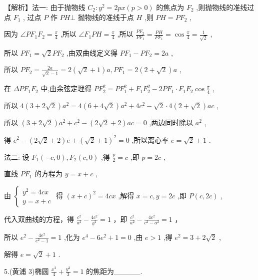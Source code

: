 \documentclass[10pt]{article}
\begin{document}
【解析】法一: 由于抛物线 \({C}_{2} : {y}^{2} = {2px}\left( {p > 0}\right)\) 的焦点为 \({F}_{2}\) ,则抛物线的准线过点 \({F}_{1}\) , 过点 \(P\) 作 \({PH} \bot\) 抛物线的准线于点 \(H\) ,则 \({PH} = P{F}_{2}\) ,

因为 \(\angle P{F}_{1}{F}_{2} = \frac{\pi }{4}\) ,所以 \(\angle {F}_{1}{PH} = \frac{\pi }{4}\) ,所以 \(\frac{P{F}_{2}}{P{F}_{1}} = \frac{PH}{P{F}_{1}} = \cos \frac{\pi }{4} = \frac{1}{\sqrt{2}}\) ,

所以 \(P{F}_{1} = \sqrt{2}P{F}_{2}\) ,由双曲线定义得 \(P{F}_{1} - P{F}_{2} = {2a}\) ,

所以 \(P{F}_{2} = \frac{2a}{\sqrt{2} - 1} = 2\left( {\sqrt{2} + 1}\right) a,P{F}_{1} = 2\left( {2 + \sqrt{2}}\right) a\) ,

在 \({\Delta P}{F}_{1}{F}_{2}\) 中,由余弦定理得 \(P{F}_{2}^{2} = P{F}_{1}^{2} + {F}_{1}{F}_{2}^{2} - {2P}{F}_{1} \cdot  {F}_{1}{F}_{2}\cos \frac{\pi }{4}\) ,

所以 \(4\left( {3 + 2\sqrt{2}}\right) {a}^{2} = 4\left( {6 + 4\sqrt{2}}\right) {a}^{2} + 4{c}^{2} - \sqrt{2} \cdot  4\left( {2 + \sqrt{2}}\right) {ac}\) ,

所以 \(\left( {3 + 2\sqrt{2}}\right) {a}^{2} + {c}^{2} - \left( {2\sqrt{2} + 2}\right) {ac} = 0\) ,两边同时除以 \({a}^{2}\) ,

得 \({e}^{2} - \left( {2\sqrt{2} + 2}\right) e + {\left( \sqrt{2} + 1\right) }^{2} = 0\) ,所以离心率 \(e = \sqrt{2} + 1\) .

法二: 设 \({F}_{1}\left( {-c,0}\right) ,{F}_{2}\left( {c,0}\right)\) ,得 \(\frac{p}{2} = c\) ,即 \(p = {2c}\) ,

直线 \(P{F}_{1}\) 的方程为 \(y = x + c\) ,

由 \(\left\{  \begin{array}{l} {y}^{2} = {4cx} \\  y = x + c \end{array}\right.\) 得 \({\left( x + c\right) }^{2} = {4cx}\) ,解得 \(x = c,y = {2c}\) ,即 \(P\left( {c,{2c}}\right)\) ,

代入双曲线的方程，得 \(\frac{{c}^{2}}{{a}^{2}} - \frac{4{c}^{2}}{{b}^{2}} = 1\) ，即 \(\frac{{c}^{2}}{{a}^{2}} - \frac{4{c}^{2}}{{c}^{2} - {a}^{2}} = 1\) ，

所以 \({e}^{2} - \frac{4{e}^{2}}{{e}^{2} - 1} = 1\) ,化为 \({e}^{4} - 6{e}^{2} + 1 = 0\) ,由 \(e > 1\) ,得 \({e}^{2} = 3 + 2\sqrt{2}\) ,

解得 \(e = \sqrt{2} + 1\) .

5.(黄浦 3)椭圆 \(\frac{{x}^{2}}{4} + \frac{{y}^{2}}{3} = 1\) 的焦距为\_\_\_\_\_.
\end{document}
